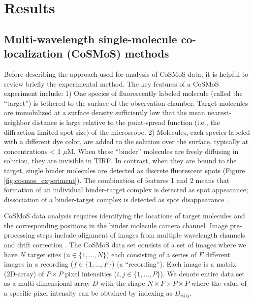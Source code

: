 \section{Results}

\subsection{Multi-wavelength single-molecule co-localization (CoSMoS) methods}

Before describing the approach used for analysis of CoSMoS data, it is helpful to  review briefly the experimental method. The key features of a CoSMoS experiment include: 1) One species of fluorescently labeled molecule (called the “target”) is tethered to the surface of the observation chamber. Target molecules are immobilized at a surface density sufficiently low that the mean nearest-neighbor distance is large relative to the point-spread function (i.e., the diffraction-limited spot size) of the microscope.
2) Molecules, each species labeled with a different dye color, are added to the solution over the surface, typically at concentrations < 1 $\mu$M. When these “binder” molecules are freely diffusing in solution, they are invisible in TIRF. In contrast, when they are bound to the target, single binder molecules are detected as discrete fluorescent spots (Figure \ref{fig:cosmos_experiment}). The combination of features 1 and 2 means that formation of an individual binder-target complex is detected as spot appearance; dissociation of a binder-target complex is detected as spot disappearance \citep{Friedman2006-kb, Friedman2015-nx}.

CoSMoS data analysis requires identifying the locations of target molecules and the corresponding positions in the binder molecule camera channel. Image pre-processing steps include alignment of images from multiple wavelength channels and drift correction \citep{Friedman2015-nx, Smith2019-yb}. The CoSMoS data set consists of a set of images where we have $N$ target sites ($n \in \{1,\dots,N\}$) each consisting of a series of $F$ different images in a recording ($f \in \{1,\dots,F\}$) (a “recording”). Each image is a matrix (2D-array) of $P \times P$ pixel intensities ($i,j \in \{1,\dots,P\}$). We denote entire data set as a multi-dimensional array $D$ with the shape $N \times F \times P \times P$ where the value of a specific pixel intensity can be obtained by indexing as $D_{nfij}$. 

